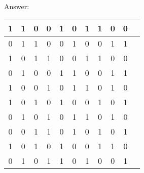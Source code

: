 \documentclass{article}
\begin{document}
Answer:
\begin{table}[ht]
\centering
\begin{tabular}{|c|c|c|c|c|c|c|c|c|c|c|}
\hline 1 & 1 & 0 & 0 & 1 & 0 & 1 & 1 & 0 & 0 \\ 
\hline 0 & 1 & 1 & 0 & 0 & 1 & 0 & 0 & 1 & 1 \\ 
\hline 1 & 0 & 1 & 1 & 0 & 0 & 1 & 1 & 0 & 0 \\ 
\hline 0 & 1 & 0 & 0 & 1 & 1 & 0 & 0 & 1 & 1 \\ 
\hline 1 & 0 & 0 & 1 & 0 & 1 & 1 & 0 & 1 & 0 \\ 
\hline 1 & 0 & 1 & 0 & 1 & 0 & 0 & 1 & 0 & 1 \\ 
\hline 0 & 1 & 0 & 1 & 0 & 1 & 1 & 0 & 1 & 0 \\ 
\hline 0 & 0 & 1 & 1 & 0 & 1 & 0 & 1 & 0 & 1 \\ 
\hline 1 & 0 & 1 & 0 & 1 & 0 & 0 & 1 & 1 & 0 \\ 
\hline 0 & 1 & 0 & 1 & 1 & 0 & 1 & 0 & 0 & 1 \\
\hline
\end{tabular}
\end{table} 
\end{document}
